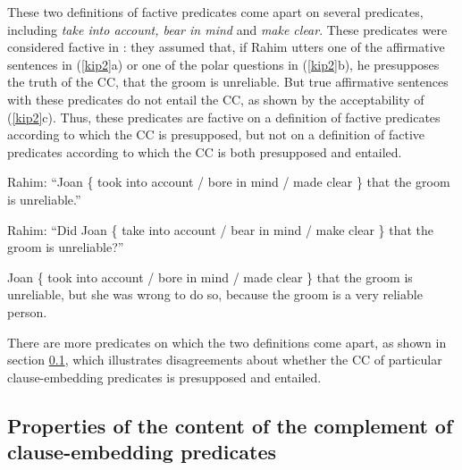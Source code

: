 \documentclass[11pt,fleqn]{article}
\newcommand{\6}{\mbox{$[\hspace*{-.6mm}[$}}
\newcommand{\9}{\mbox{$]\hspace*{-.6mm}]$}}
\begin{document}
These two definitions of factive predicates come apart on several predicates, including {\em take into account, bear in mind} and {\em make clear}. These predicates were considered factive in \citealt{kiparsky-kiparsky70}: they assumed that, if Rahim utters one of the affirmative sentences in (\ref{kip2}a) or one of the polar questions in (\ref{kip2}b), he presupposes the truth of the CC, that the groom is unreliable. But true affirmative sentences with these predicates do not entail the CC, as shown by the acceptability of (\ref{kip2}c). Thus, these predicates are factive on a definition of factive predicates according to which the CC is presupposed, but not on a definition of factive predicates according to which the CC is both presupposed and entailed.

\begin{exe}
\ex\label{kip2}
\begin{xlist}
\ex Rahim: ``Joan  \{ took into account / bore in mind / made clear \}  that the groom is unreliable.''

\ex Rahim: ``Did Joan \{ take into account / bear in mind / make clear \} that the groom is unreliable?''

\ex Joan  \{ took into account / bore in mind / made clear \} that the groom is unreliable, but she was wrong to do so, because the groom is a very reliable person.
\end{xlist}
\end{exe}
There are more predicates on which the two definitions come apart, as shown in section \ref{s12}, which illustrates disagreements about whether the CC of particular clause-embedding predicates is presupposed and entailed.

\subsection{Properties of the content of the complement of clause-embedding predicates}\label{s12}
\end{document}
